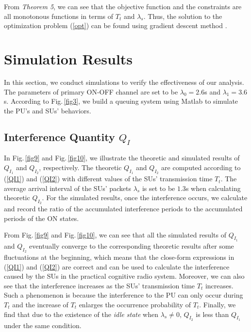 \documentclass[11pt,draftcls]{IEEEtran}{\onecolumn}
\begin{document}
From \emph{Theorem 5}, we can see that the objective function and
the constraints are all monotonous functions in terms of $T_t$ and
$\lambda_s$. Thus, the solution to the optimization problem
(\ref{opt}) can be found using gradient descent method \cite{14}.

\section{Simulation Results}\label{simu}

In this section, we conduct simulations to verify the effectiveness
of our analysis. The parameters of primary ON-OFF channel are set to
be $\lambda_0=2.6$s and $\lambda_1=3.6$s. According to
Fig.\,\ref{fig3}, we build a queuing system using Matlab to simulate
the PU's and SUs' behaviors.

\subsection{Interference Quantity $Q_{I}$}

In Fig.\,\ref{fig9} and Fig.\,\ref{fig10}, we illustrate the
theoretic and simulated results of $Q_{I_1}$ and $Q_{I_2}$,
respectively. The theoretic $Q_{I_1}$ and $Q_{I_2}$ are computed
according to (\ref{QI1}) and (\ref{QI2}) with different values of
the SUs' transmission time $T_t$. The average arrival interval of
the SUs' packets $\lambda_s$ is set to be $1.3$s when calculating
theoretic $Q_{I_2}$. For the simulated results, once the
interference occurs, we calculate and record the ratio of the
accumulated interference periods to the accumulated periods of the
ON states.

From Fig.\,\ref{fig9} and Fig.\,\ref{fig10}, we can see that all the
simulated results of $Q_{I_1}$ and $Q_{I_2}$ eventually converge to
the corresponding theoretic results after some fluctuations at the
beginning, which means that the close-form expressions in
(\ref{QI1}) and (\ref{QI2}) are correct and can be used to calculate
the interference caused by the SUs in the practical cognitive radio
system. Moreover, we can also see that the interference increases as
the SUs' transmission time $T_t$ increases. Such a phenomenon is
because the interference to the PU can only occur during $T_t$ and
the increase of $T_t$ enlarges the occurrence probability of $T_t$.
Finally, we find that due to the existence of the \emph{idle state}
when $\lambda_s \ne 0$,  $Q_{I_2}$ is less than $Q_{I_1}$ under the
same condition.
\end{document}

